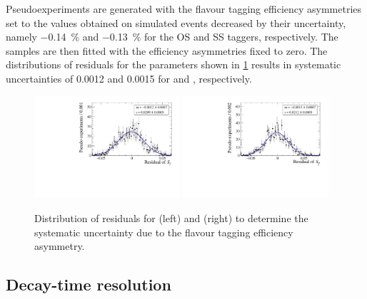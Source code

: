 Pseudoexperiments are generated with the flavour tagging efficiency asymmetries set to the values obtained on simulated events decreased by their uncertainty, namely \SI{-0.14}{\percent} and \SI{-0.13}{\percent} for the OS and SS taggers, respectively.
The samples are then fitted with the efficiency asymmetries fixed to zero.
The distributions of residuals for the \CP parameters shown in \cref{fig:systUncertFTeffasym} results in systematic uncertainties of \num{0.0012} and \num{0.0015} for \Sf and \Sfbar, respectively.
\begin{figure}[tbp]
    \centering
    \includegraphics[width=0.48\textwidth]{10Systematics/figs/TagEffAsym_Sf_res.pdf}
    \includegraphics[width=0.48\textwidth]{10Systematics/figs/TagEffAsym_Sfbar_res.pdf}
    \caption{Distribution of residuals for \Sf (left) and \Sfbar (right) to determine the systematic uncertainty due to the flavour tagging efficiency asymmetry.}
    \label{fig:systUncertFTeffasym}
\end{figure}

\subsection*{Decay-time resolution}

